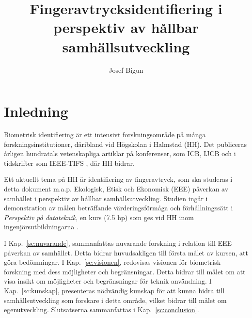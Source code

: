 \documentclass{article}
\begin{document}
\title{Fingeravtrycksidentifiering i perspektiv av  hållbar  samhällsutveckling}
\author{Josef Bigun}
\date{}
\maketitle
{}

\section{Inledning}
\label{sc:intro}

Biometrisk identifiering är ett intensivt forskningsområde på många forskningsinstitutioner, däribland vid Högskolan i Halmstad (HH).  Det publiceras årligen hundratals vetenskapliga artiklar på konferenser,
som ICB, IJCB \cite{webicb,webijcb}  och i tidskrifter som IEEE-TIFS
\cite{webtifs},  där HH bidrar.

Ett aktuellt tema på HH är identifiering av fingeravtryck, som ska studeras i detta dokument m.a.p. Ekologisk, Etisk och Ekonomisk (EEE) påverkan av samhället i perspektiv av hållbar samhällsutveckling. Studien ingår i demonstration av  målen beträffande värderingsförmåga och förhållningssätt i {\em Perspektiv på datateknik}, en  kurs (7.5 hp) som ges vid HH inom ingenjörsutbildningarna \cite{webutbplan}.

I Kap.~\ref{sc:nuvarande}, sammanfattas nuvarande forskning i relation till EEE påverkan av samhället. Detta bidrar huvudsakligen till första målet av kursen, att göra bedömningar. I Kap.~\ref{sc:visionen}, redovisas  visionen för biometrisk forskning med dess möjligheter och begränsningar. Detta bidrar till målet om att visa insikt om möjligheter och begränsningar för teknik användning. I
Kap.~\ref{sc:kunskap}, presenteras nödvändig kunskap för att kunna
bidra till samhällsutveckling som forskare i detta område, vilket
bidrar till målet om egenutveckling.
Slutsatserna  sammanfattas  i Kap.~\ref{sc:conclusion}. 
\end{document}
